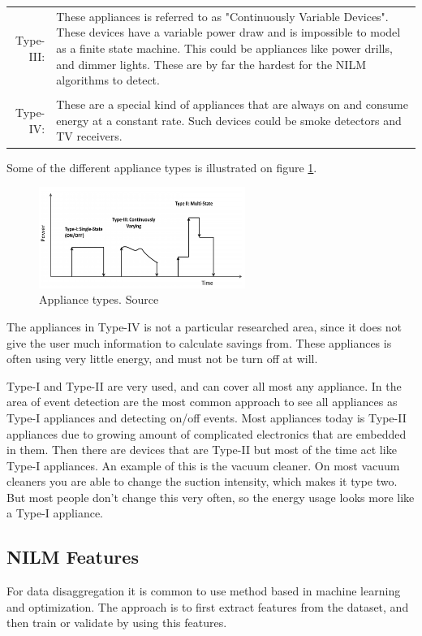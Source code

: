 \begin{tabularx}{\linewidth}{ r X }
Type-III:&These appliances is referred to as "Continuously Variable
Devices". These devices have a variable power draw and is impossible to model as a finite state machine. This could be appliances like power drills, and dimmer lights. These are by far the hardest for the NILM algorithms to detect. \\
\\
Type-IV:& These are a special kind of appliances that are always on and consume energy at a constant rate. Such devices could be smoke detectors and TV receivers.  \\
\end{tabularx}

Some of the different appliance types is illustrated on figure \ref{fig:ATO}. 


\begin{figure}[H]
\centering
\includegraphics[width=0.6\textwidth]{billeder/Types.png}
\caption{Appliance types. Source \citep{RefWorks:17}}
\label{fig:ATO}
\end{figure}

The appliances in Type-IV is not a particular researched area, since it does not give the user much information to calculate savings from. These appliances is often using very little energy, and must not be turn off at will. 

Type-I and Type-II are very used, and can cover all most any appliance. In the area of event detection are the most common approach to see all appliances as Type-I appliances and detecting on/off events. Most appliances today is Type-II appliances due to growing amount of complicated electronics that are embedded in them. Then there are devices that are Type-II but most of the time act like Type-I appliances. An example of this is the vacuum cleaner. On most vacuum cleaners you are able to change the suction intensity, which makes it type two. But most people don't change this very often, so the energy usage looks more like a Type-I appliance. 
 
\subsection{NILM Features} 
For data disaggregation it is common to use method based in machine learning and optimization. The approach is to first extract features from the dataset, and then train or validate by using this features. 

